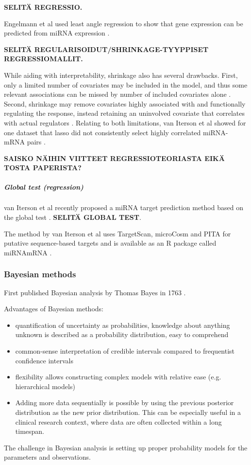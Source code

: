 \textbf{SELITÄ REGRESSIO.}

Engelmann et al used least angle regression to show that gene expression can
be predicted from miRNA expression \citep{Engelmann}.

\textbf{SELITÄ REGULARISOIDUT/SHRINKAGE-TYYPPISET REGRESSIOMALLIT.}

While aiding with interpretability, shrinkage also has several drawbacks.
First, only a limited number of covariates may be included in the model, and
thus some relevant associations can be missed by number of included covariates
alone \citep{vanIterson2013}. Second, shrinkage may remove covariates highly
associated with and functionally regulating the response, instead retaining an
uninvolved covariate that correlates with actual regulators \citep{Engelmann}.
Relating to both limitations, van Iterson et al showed for one dataset that
lasso did not consistently select highly correlated miRNA-mRNA pairs
\citep{vanIterson2013}.

\textbf{SAISKO NÄIHIN VIITTEET REGRESSIOTEORIASTA EIKÄ TOSTA PAPERISTA?}


\subparagraph{Global test (regression)}\label{global-test-regression}

van Iterson et al recently proposed a miRNA target prediction method based on
the global test \citep{vanIterson2013}. \textbf{SELITÄ GLOBAL TEST}.

The method by van Iterson et al uses TargetScan, microCosm and PITA for
putative sequence-based targets and is available as an R package called
miRNAmRNA \citep{vanItersonWeb}.





\subsubsection{Bayesian methods}\label{bayesian-methods}

First published Bayesian analysis by Thomas Bayes in 1763 \citep{Gelman2013}.

Advantages of Bayesian methods:
\begin{itemize}
\tightlist
  \item
  quantification of uncertainty as probabilities, knowledge about anything
  unknown is described as a probability distribution, easy to comprehend
  \item
  common-sense interpretation of credible intervals compared to frequentist
  confidence intervals
  \item
  flexibility allows constructing complex models with relative ease (e.g.
  hierarchical models)
  \item
  Adding more data sequentially is possible by using the previous posterior
  distribution as the new prior distribution. This can be especially useful in
  a clinical research context, where data are often collected within a long
  timespan.
\end{itemize}
The challenge in Bayesian analysis is setting up proper probability models for
the parameters and observations. \citep{Gelman2013}

